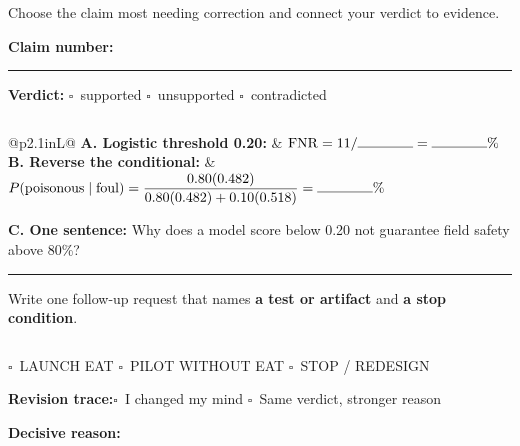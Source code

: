 \documentclass[10pt]{article}
\newcommand{\checkbox}{\(\square\)}
\newcommand{\Subhead}[1]{%
  \par\vspace{0.55em}{\bfseries #1}\par\vspace{0.18em}
}
\newcommand{\AnswerBox}[1]{%
  \par\vspace{0.2em}
  \noindent\begin{tabular}{|p{\dimexpr\linewidth-2\tabcolsep-2\arrayrulewidth\relax}|}
    \hline
    \rule{0pt}{#1} \\
    \hline
  \end{tabular}
  \par
}
\begin{document}
\Subhead{1. Claim audit}
Choose the claim most needing correction and connect your verdict to evidence.

\vspace{0.3em}
\textbf{Claim number:} \rule{0.42in}{0.4pt}\qquad
\textbf{Verdict:} \checkbox\ supported \quad \checkbox\ unsupported \quad \checkbox\ contradicted

\AnswerBox{0.72in}

\Subhead{2. Make the risk legible}
\begin{tabularx}{\linewidth}{@{}p{2.1in}L@{}}
  \textbf{A. Logistic threshold 0.20:} & \(\mathrm{FNR}=11/\rule{0.55in}{0.4pt}=\rule{0.55in}{0.4pt}\%\) \\
  \addlinespace[0.45em]
  \textbf{B. Reverse the conditional:} & \(P(\text{poisonous}\mid\text{foul})=\dfrac{0.80(0.482)}{0.80(0.482)+0.10(0.518)}=\rule{0.55in}{0.4pt}\%\)
\end{tabularx}

\vspace{0.45em}
\textbf{C. One sentence:} Why does a model score below 0.20 not guarantee field safety above 80\%?
\vspace{0.45em}\hrule

\Subhead{3. Make the AI-fluent next move}
Write one follow-up request that names \textbf{a test or artifact} and \textbf{a stop condition}.
\AnswerBox{0.54in}

\Subhead{Final disposition}
\checkbox\ LAUNCH EAT \qquad \checkbox\ PILOT WITHOUT EAT \qquad \checkbox\ STOP / REDESIGN

\vspace{0.45em}
\textbf{Revision trace:}\quad \checkbox\ I changed my mind \qquad \checkbox\ Same verdict, stronger reason

\vspace{0.45em}
\textbf{Decisive reason:}\quad \hrulefill
\end{document}
